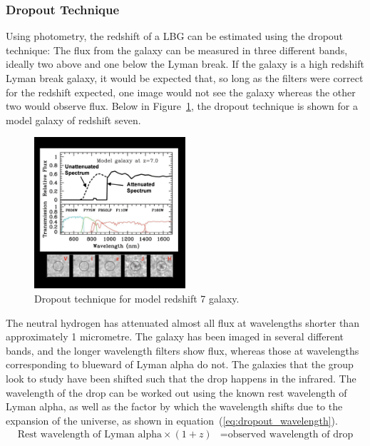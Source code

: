 		\subsubsection{Dropout Technique} %
		\label{ssub:dropout_technique}
			Using photometry, the redshift of a LBG can be estimated using the dropout technique: The flux from the galaxy can be measured in three different bands, ideally two above and one below the Lyman break. If the galaxy is a high redshift Lyman break galaxy, it would be expected that, so long as the filters were correct for the redshift expected, one image would not see the galaxy whereas the other two would observe flux. Below in Figure~\ref{fig:drop_out_at_z7}, the dropout technique is shown for a model galaxy of redshift seven.
			\begin{figure}[!htbp]
				\centering
				\includegraphics[width=0.5\textwidth]{../Images/drop_out_at_z7.png}
				\caption{Dropout technique for model redshift 7 galaxy\cite{first_galaxies_dropout_at_z7}.\label{fig:drop_out_at_z7}}
			\end{figure}

			The neutral hydrogen has attenuated almost all flux at wavelengths shorter than approximately 1 micrometre. The galaxy has been imaged in several different bands, and the longer wavelength filters show flux, whereas those at wavelengths corresponding to blueward of Lyman alpha do not. The galaxies that the group look to study have been shifted such that the drop happens in the infrared. The wavelength of the drop can be worked out using the known rest wavelength of Lyman alpha, as well as the factor by which the wavelength shifts due to the expansion of the universe, as shown in equation~(\ref{eq:dropout_wavelength}).
			\begin{align}
				\text{Rest wavelength of Lyman alpha} \times (1+z) &= \text{observed wavelength of drop}\label{eq:dropout_wavelength}
			\end{align}

